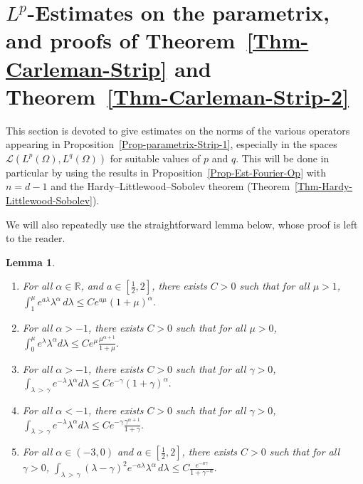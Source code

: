 \documentclass[10pt]{amsart}
\newtheorem{lemm}[theo]{Lemma}\newtheorem{prop}[theo]{Proposition}\newtheorem{coro}[theo]{Corollary}\newtheorem{conj}[theo]{Conjecture}
\theoremstyle{definition}\newtheorem{defi}[theo]{Definition}\newtheorem{rema}[theo]{Remark}\newtheorem{exam}[theo]{Example}\newtheorem{exem}[theo]{Example}\newtheorem{nota}[theo]{Notation}
\newcommand{\scL}{\mathscr{L}}
\newcommand*\R{\mathbb{R}}
\newcommand*\ds{\displaystyle}
\renewcommand{\leq}{\leqslant}
\begin{document}
\section{\texorpdfstring{$L^p$}{Lp}-Estimates on the parametrix, and proofs of Theorem~\ref{Thm-Carleman-Strip} and Theorem~\ref{Thm-Carleman-Strip-2}}\label{Sec-Est-Parametrix}

This section is devoted to give estimates on the norms of the various operators appearing in Proposition~\ref{Prop-parametrix-Strip-1}, especially in the spaces $\scL(L^p(\Omega), L^q(\Omega))$ for suitable values of $p$ and $q$. This will be done in particular by using the results in Proposition~\ref{Prop-Est-Fourier-Op} with $n =d -1$ and the Hardy--Littlewood--Sobolev theorem (Theorem~\ref{Thm-Hardy-Littlewood-Sobolev}).

We will also repeatedly use the straightforward lemma below, whose proof is left to the reader.

\begin{lemm}\label{lem-general-inequalities}\leavevmode
\begin{enumerate}
\item \label{item-1-lemma-6.1}
For all $\alpha \! \in \R$, and $a \! \in \! [\frac{1}{2}, 2]$, there exists $C>0$ such that for all $\mu >1$,\linebreak $
\int_1^\mu e^{a\lambda} \lambda^\alpha \, d\lambda \leq C e^{a \mu} (1+ \mu)^\alpha. $

\item\label{item-2-lemma-6.1}
For all $\alpha >-1$, there exists $C>0$ such that for all $\mu >0$, $
\int_0^\mu e^{\lambda} \lambda^\alpha d\lambda \leq C e^{ \mu} \frac{\mu^{\alpha+1}}{1+ \mu}. $

\item \label{item-3-lemma-6.1}
For all $\alpha > -1$, there exists $C >0$ such that for all $\gamma >0$, $
\int_{\lambda\,>\,\gamma} e^{-\lambda} \lambda^{\alpha} d \lambda \leqslant C e^{-\gamma} (1+ \gamma)^\alpha. $
\item \label{item-4-lemma-6.1}
For all $\alpha < -1$, there exists $C >0$ such that for all $\gamma >0$, $
\int_{\lambda\,>\,\gamma} e^{-\lambda} \lambda^{\alpha} d \lambda \leqslant C e^{-\gamma} \frac{\gamma^{\alpha+1}}{1+\gamma}. $
\item \label{item-5-lemma-6.1}
For all $\alpha \in (-3,0)$ and $a \in [\frac{1}{2}, 2]$, there exists $C >0$ such that for all $\gamma >0$,
$
\int_{\lambda\,>\,\gamma} (\lambda - \gamma)^2 e^{-a \lambda} \lambda^{\alpha} \, d \lambda
\leq C \frac{e^{- a \gamma}}{1+ \gamma^{- \alpha }}. $
\end{enumerate}
\end{lemm}
\end{document}
